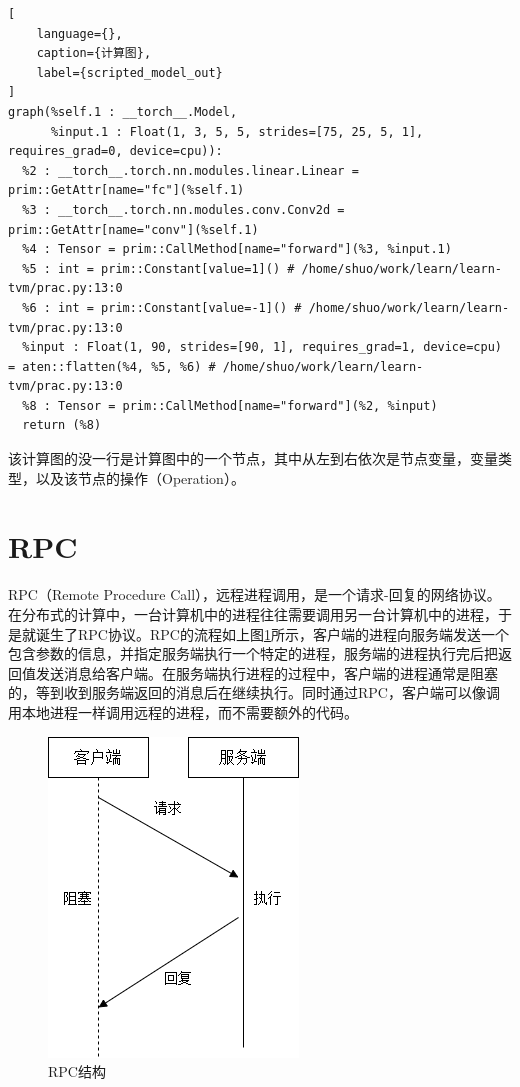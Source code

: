 \begin{lstlisting}[
    language={},
    caption={计算图},
    label={scripted_model_out}
]
graph(%self.1 : __torch__.Model,
      %input.1 : Float(1, 3, 5, 5, strides=[75, 25, 5, 1], requires_grad=0, device=cpu)):
  %2 : __torch__.torch.nn.modules.linear.Linear = prim::GetAttr[name="fc"](%self.1)
  %3 : __torch__.torch.nn.modules.conv.Conv2d = prim::GetAttr[name="conv"](%self.1)
  %4 : Tensor = prim::CallMethod[name="forward"](%3, %input.1)
  %5 : int = prim::Constant[value=1]() # /home/shuo/work/learn/learn-tvm/prac.py:13:0
  %6 : int = prim::Constant[value=-1]() # /home/shuo/work/learn/learn-tvm/prac.py:13:0
  %input : Float(1, 90, strides=[90, 1], requires_grad=1, device=cpu) = aten::flatten(%4, %5, %6) # /home/shuo/work/learn/learn-tvm/prac.py:13:0
  %8 : Tensor = prim::CallMethod[name="forward"](%2, %input)
  return (%8)
\end{lstlisting}

该计算图的没一行是计算图中的一个节点，其中从左到右依次是节点变量，变量类型，以及该节点的操作（Operation）。


\section{RPC}


RPC（Remote Procedure Call），远程进程调用，是一个请求-回复的网络协议。在分布式的计算中，一台计算机中的进程往往需要调用另一台计算机中的进程，于是就诞生了RPC协议。RPC的流程如上图\ref{rpc}所示，客户端的进程向服务端发送一个包含参数的信息，并指定服务端执行一个特定的进程，服务端的进程执行完后把返回值发送消息给客户端。在服务端执行进程的过程中，客户端的进程通常是阻塞的，等到收到服务端返回的消息后在继续执行。同时通过RPC，客户端可以像调用本地进程一样调用远程的进程，而不需要额外的代码。

\begin{figure}[h!]
    \centering
    \includegraphics[width=180bp]{figure/rpc.png}
    \caption{RPC结构}
    \label{rpc}
\end{figure}

